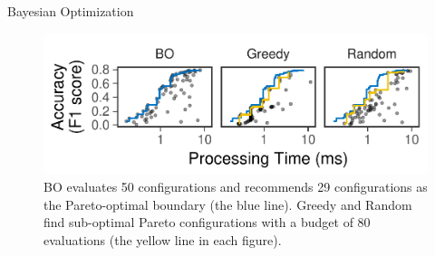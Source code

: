 \begin{frame}{Bayesian Optimization}
  \vspace{1em}
  \begin{figure}
    \centering
    \includegraphics[width=0.95\linewidth]{figures/serving-eval-bo.pdf}
    \caption{BO evaluates 50 configurations and recommends 29 configurations as
      the Pareto-optimal boundary (the blue line). Greedy and Random find
      sub-optimal Pareto configurations with a budget of 80 evaluations (the
      yellow line in each figure).}
  \end{figure}
\end{frame}

